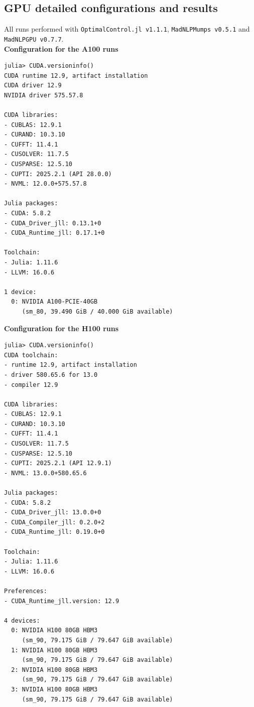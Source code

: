 \subsection{GPU detailed configurations and results} \label{sa2}
All runs performed with \texttt{OptimalControl.jl v1.1.1},
\texttt{MadNLPMumps v0.5.1} and
\texttt{MadNLPGPU v0.7.7}.\\

\noindent \textbf{Configuration for the A100 runs}

{\small \begin{verbatim}
julia> CUDA.versioninfo()
CUDA runtime 12.9, artifact installation
CUDA driver 12.9
NVIDIA driver 575.57.8

CUDA libraries: 
- CUBLAS: 12.9.1
- CURAND: 10.3.10
- CUFFT: 11.4.1
- CUSOLVER: 11.7.5
- CUSPARSE: 12.5.10
- CUPTI: 2025.2.1 (API 28.0.0)
- NVML: 12.0.0+575.57.8

Julia packages: 
- CUDA: 5.8.2
- CUDA_Driver_jll: 0.13.1+0
- CUDA_Runtime_jll: 0.17.1+0

Toolchain:
- Julia: 1.11.6
- LLVM: 16.0.6

1 device:
  0: NVIDIA A100-PCIE-40GB
     (sm_80, 39.490 GiB / 40.000 GiB available)
\end{verbatim}}

\noindent \textbf{Configuration for the H100 runs}

{\small \begin{verbatim}
julia> CUDA.versioninfo()
CUDA toolchain: 
- runtime 12.9, artifact installation
- driver 580.65.6 for 13.0
- compiler 12.9

CUDA libraries: 
- CUBLAS: 12.9.1
- CURAND: 10.3.10
- CUFFT: 11.4.1
- CUSOLVER: 11.7.5
- CUSPARSE: 12.5.10
- CUPTI: 2025.2.1 (API 12.9.1)
- NVML: 13.0.0+580.65.6

Julia packages: 
- CUDA: 5.8.2
- CUDA_Driver_jll: 13.0.0+0
- CUDA_Compiler_jll: 0.2.0+2
- CUDA_Runtime_jll: 0.19.0+0

Toolchain:
- Julia: 1.11.6
- LLVM: 16.0.6

Preferences:
- CUDA_Runtime_jll.version: 12.9

4 devices:
  0: NVIDIA H100 80GB HBM3
     (sm_90, 79.175 GiB / 79.647 GiB available)
  1: NVIDIA H100 80GB HBM3
     (sm_90, 79.175 GiB / 79.647 GiB available)
  2: NVIDIA H100 80GB HBM3
     (sm_90, 79.175 GiB / 79.647 GiB available)
  3: NVIDIA H100 80GB HBM3
     (sm_90, 79.175 GiB / 79.647 GiB available)
\end{verbatim}}


